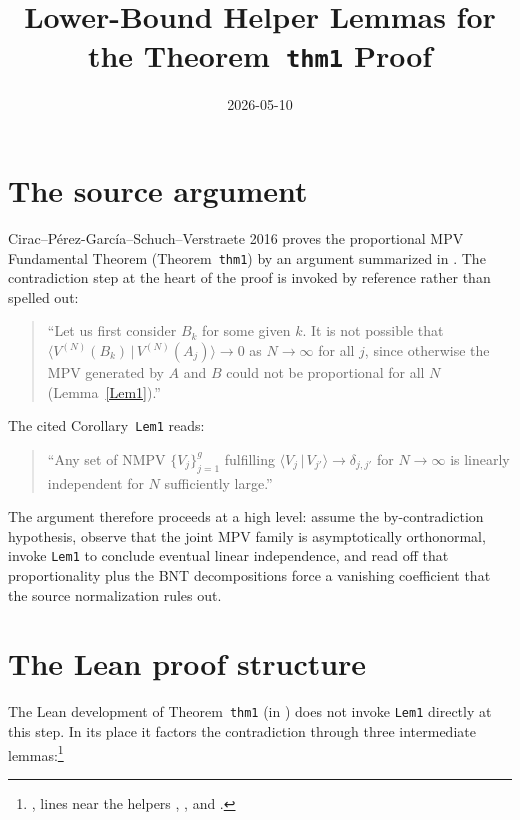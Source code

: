 \documentclass[11pt]{article}
\title{Lower-Bound Helper Lemmas for the Theorem~\texttt{thm1} Proof}
\author{}
\date{2026-05-10}
\begin{document}
\maketitle

\section{The source argument}

Cirac--P\'erez-Garc\'ia--Schuch--Verstraete 2016 proves the proportional MPV
Fundamental Theorem (Theorem~\texttt{thm1}) by an argument summarized in
\cite[lines~1170--1192]{Cirac2016MPDO_arXiv}.  The contradiction step at the
heart of the proof is invoked by reference rather than spelled out:

\begin{quote}
    ``Let us first consider $B_k$ for some given $k$.  It is not possible
    that $\langle V^{(N)}(B_k)\,|\,V^{(N)}(A_j)\rangle\to 0$ as
    $N\to\infty$ for all $j$, since otherwise the MPV generated by $A$ and
    $B$ could not be proportional for all $N$ (Lemma~\ref{Lem1}).''
\end{quote}

The cited Corollary~\texttt{Lem1} reads:

\begin{quote}
    ``Any set of NMPV $\{V_j\}_{j=1}^g$ fulfilling
    $\langle V_j\,|\,V_{j'}\rangle\to\delta_{j,j'}$ for $N\to\infty$
    is linearly independent for $N$ sufficiently large.''
    \cite[Corollary~\texttt{Lem1}]{Cirac2016MPDO_arXiv}
\end{quote}

The argument therefore proceeds at a high level: assume the by-contradiction
hypothesis, observe that the joint MPV family is asymptotically orthonormal,
invoke \texttt{Lem1} to conclude eventual linear independence, and read off
that proportionality plus the BNT decompositions force a vanishing
coefficient that the source normalization rules out.

\section{The Lean proof structure}

The Lean development of Theorem~\texttt{thm1} (in
) does not
invoke \texttt{Lem1} directly at this step.  In its place it factors the
contradiction through three intermediate lemmas:\footnote{%
, lines
near the helpers ,
, and
.}
\end{document}
